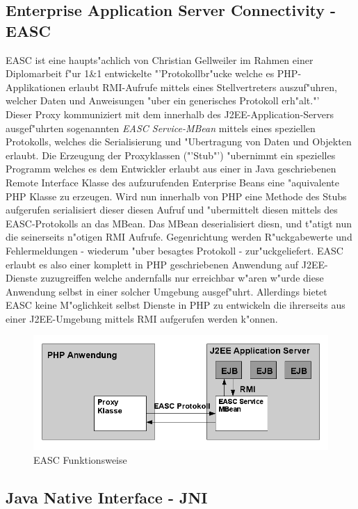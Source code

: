 \subsection{Enterprise Application Server Connectivity - EASC}
\label{sec:intro:stand:easc}
EASC ist eine haupts"achlich von Christian Gellweiler im Rahmen einer Diplomarbeit f"ur 1\&1 entwickelte 
"'Protokollbr"ucke welche es PHP-Applikationen erlaubt RMI-Aufrufe mittels eines Stellvertreters auszuf"uhren, welcher
Daten und Anweisungen "uber ein generisches Protokoll erh"alt."' \cite{EASC}\\
Dieser Proxy kommuniziert mit dem innerhalb des J2EE-Application-Servers ausgef"uhrten sogenannten \emph{EASC Service-MBean} mittels
eines speziellen Protokolls, welches die Serialisierung und "Ubertragung von Daten und Objekten erlaubt.
Die Erzeugung der Proxyklassen ("'Stub"') "ubernimmt ein spezielles Programm welches es dem Entwickler erlaubt aus einer in Java geschriebenen
Remote Interface Klasse des aufzurufenden Enterprise Beans eine "aquivalente PHP Klasse zu erzeugen.
Wird nun innerhalb von PHP eine Methode des Stubs aufgerufen serialisiert dieser diesen Aufruf und "ubermittelt diesen mittels des EASC-Protokolls
an das MBean. Das MBean deserialisiert diesn, und t"atigt nun die seinerseits n"otigen RMI Aufrufe.
Gegenrichtung werden R"uckgabewerte und Fehlermeldungen - wiederum "uber besagtes Protokoll - zur"uckgeliefert.
EASC erlaubt es also einer komplett in PHP geschriebenen Anwendung auf J2EE-Dienste zuzugreiffen welche andernfalls nur
erreichbar w"aren w"urde diese Anwendung selbst in einer solcher Umgebung ausgef"uhrt. Allerdings bietet EASC keine M"oglichkeit
selbst Dienste in PHP zu entwickeln die ihrerseits aus einer J2EE-Umgebung mittels RMI aufgerufen werden k"onnen.
\begin{figure}[h]
\includegraphics[width=\textwidth]{intro/img/easc.png}
\caption{EASC Funktionsweise}
\label{fig:easc}
\end{figure}

\subsection{Java Native Interface - JNI}
\label{sec:intro:stand:JNI}

